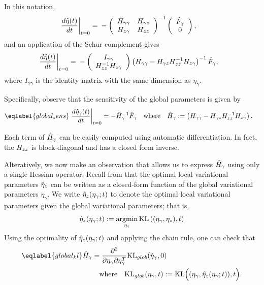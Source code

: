 In this notation,
%
\begin{align*}
%
\fracat{d \etaopt(\t)}{d \t}{t = 0} ={}&
-\left(
\begin{array}{cc}
   \hess{\gamma\gamma} & \hess{\gamma\z} \\
   \hess{\z\gamma}     & \hess{\z\z} \\
\end{array}
\right)^{-1}
\left( \begin{array}{c} \crosshessian_\gamma \\ 0 \end{array}\right),
%
\end{align*}
%
and an application of the Schur complement gives
%
\begin{align*}
%
\fracat{d \etaopt(\t)}{d \t}{t = 0} ={}&
-\left(\begin{array}{c}
I_{\gamma\gamma} \\
\hess{\z\z}^{-1} \hess{\z\gamma}
\end{array}\right)
\left(\hess{\gamma\gamma} -
      \hess{\gamma\z} \hess{\z\z}^{-1} \hess{\z\gamma}\right)^{-1} \crosshessian_\gamma,
%
\end{align*}
where $I_{\gamma\gamma}$ is the identity matrix with
the same dimension as $\eta_\gamma$.

Specifically, observe that the sensitivity of the global parameters
is given by
\begin{align}\eqlabel{global_sens}
  \fracat{d \etaopt_\gamma(\t)}{d \t}{t = 0} &=
  - \hessopt_\gamma^{-1}\crosshessian_\gamma
  \mathwhere
  \hessopt_\gamma := \left(\hess{\gamma\gamma} -
        \hess{\gamma\z} \hess{\z\z}^{-1} \hess{\z\gamma}\right).
\end{align}


Each term of $\hat{H}_\gamma$ can be easily computed using automatic differentiation.
In fact, the $H_{zz}$ is block-diagonal and has a closed form inverse.

Alteratively, we now make an observation that allows us to express $\hat{H}_\gamma$
using only a single Hessian operator.
Recall from  that the optimal local variational parameters $\hat\eta_{z}$ can be written
as a closed-form function of the global variational parameters $\eta_\gamma$.
We write $\hat\eta_{z}(\eta_\gamma; t)$ to denote the optimal local variational parameters given the
global variational parameters; that is,
\begin{align*}
  \hat\eta_{z}(\eta_\gamma; t) := \operatorname*{\mathrm{argmin}}_{\eta_z} \mathrm{KL}\left((\eta_\gamma, \eta_z), t\right)
\end{align*}
Using the optimality of $\hat\eta_{z}(\eta_\gamma; t)$ and applying the chain rule, one can check that
\begin{align}\eqlabel{global_kl}
\hessopt_{\gamma} &=
\frac{\partial^2}{\partial\eta_\gamma\partial\eta_\gamma^T} \mathrm{KL}_{glob}(\etaopt_\gamma, 0) \\
& \mathwhere
\mathrm{KL}_{glob}(\eta_\gamma, \t) := \mathrm{KL}\Big((\eta_\gamma, \etaoptz(\eta_\gamma; \t)), \t\Big).
\notag
\end{align}

